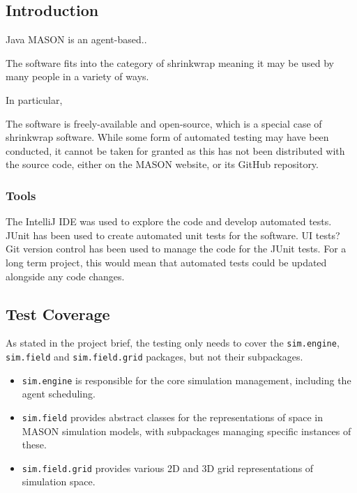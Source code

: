 \documentclass[11pt]{article}
\begin{document}
\subsection{Introduction}
Java MASON is an agent-based..

The software fits into the category of shrinkwrap meaning it may be used by many people in a variety of ways.

In particular, 

The software is freely-available and open-source, which is a special case of shrinkwrap software.
While some form of automated testing may have been conducted, it cannot be taken for granted as this has not been distributed with the source code, either on the MASON website, or its GitHub repository.

\subsubsection{Tools}
The IntelliJ IDE was used to explore the code and develop automated tests.
JUnit has been used to create automated unit tests for the software.
UI tests?
\\

Git version control has been used to manage the code for the JUnit tests. For a long term project, this would mean that automated tests could be updated alongside any code changes.

\subsection{Test Coverage}
As stated in the project brief, the testing only needs to cover the \texttt{sim.engine}, \texttt{sim.field} and \texttt{sim.field.grid} packages, but not their subpackages.
\begin{itemize}
\item \texttt{sim.engine} is responsible for the core simulation management, including the agent scheduling.
\item \texttt{sim.field} provides abstract classes for the representations of space in MASON simulation models, with subpackages managing specific instances of these.
\item \texttt{sim.field.grid} provides various 2D and 3D grid representations of simulation space.
\end{itemize}
\end{document}
